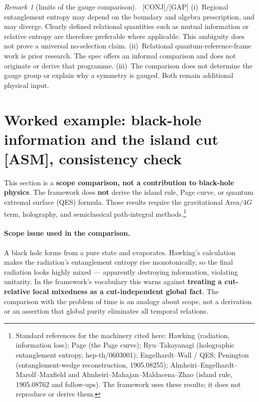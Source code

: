\documentclass[11pt]{article}
\newcommand{\asm}{\textcolor{blue!70!black}{\textsf{\small[ASM]}}}
\newcommand{\conj}{\textcolor{orange!80!black}{\textsf{\small[CONJ]}}}
\newcommand{\post}{\textcolor{purple!70!black}{\textsf{\small[POST]}}}
\newcommand{\gap}{\textcolor{red!75!black}{\textsf{\small[GAP]}}}
\def\conj{[CONJ]}\def\post{[POST]}\def\gap{[GAP]}%
\def\quad{ }\def\normalsize{}%
\theoremstyle{definition}
\theoremstyle{remark}
\newtheorem*{remark}{Remark}
\begin{document}
\begin{remark}[limits of the gauge comparison]{\normalfont\ \conj/\gap}
(i)~Regional entanglement entropy may depend on the boundary and algebra prescription, and may diverge. Clearly defined relational quantities such as mutual information or relative entropy are therefore preferable where applicable. This ambiguity does not prove a universal no-selection claim.
(ii)~Relational quantum-reference-frame work is prior research. The spec offers an informal comparison and does not originate or derive that programme.
(iii)~The comparison does not determine the gauge group or explain why a symmetry is gauged. Both remain additional physical input.
\end{remark}

\section{Worked example: black-hole information and the island cut \quad{\normalsize\asm, consistency check}\label{sec:bh}}

This section is a \textbf{scope comparison, not a contribution to black-hole physics}. The framework does \textbf{not} derive the island rule, Page curve, or quantum extremal surface (QES) formula. Those results require the gravitational $\mathrm{Area}/4G$ term, holography, and semiclassical path-integral methods.\footnote{Standard references for the machinery cited here: Hawking (radiation, information loss); Page (the Page curve); Ryu--Takayanagi (holographic entanglement entropy, hep-th/0603001); Engelhardt--Wall / QES; Penington (entanglement-wedge reconstruction, 1905.08255); Almheiri--Engelhardt--Marolf--Maxfield and Almheiri--Mahajan--Maldacena--Zhao (island rule, 1905.08762 and follow-ups). The framework uses these results; it does not reproduce or derive them.}

\paragraph{Scope issue used in the comparison.}
A black hole forms from a pure state and evaporates. Hawking's calculation makes the radiation's entanglement entropy rise monotonically, so the final radiation looks highly mixed --- apparently destroying information, violating unitarity. In the framework's vocabulary this warns against \textbf{treating a cut-relative local mixedness as a cut-independent global fact}. The comparison with the problem of time is an analogy about scope, not a derivation or an assertion that global purity eliminates all temporal relations.
\end{document}
